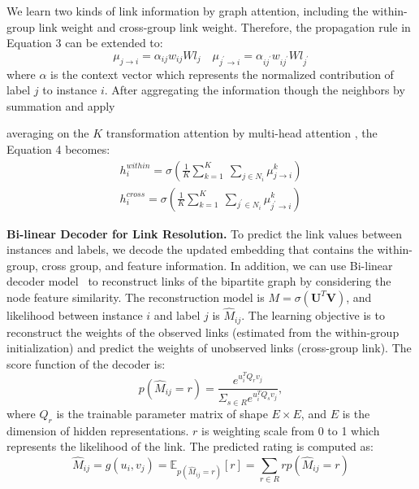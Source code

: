\documentclass[letterpaper]{article} \usepackage{aaai20}  \usepackage{times}  \usepackage{helvet} \usepackage{courier}  \usepackage[hyphens]{url}  \usepackage{graphicx} \urlstyle{rm} \def\UrlFont{\rm}  \frenchspacing  \setlength{\pdfpagewidth}{8.5in}  \setlength{\pdfpageheight}{11in}  \frenchspacing
\begin{document}
\noindent We learn two kinds of link information by graph attention, including the within-group link weight and cross-group link weight. 
Therefore, the propagation rule in Equation 3 can be extended to:
\begin{equation}
\mu_{j \rightarrow i} = \alpha_{ij} w_{ij} W l_j  \quad
\mu_{j^{\prime} \rightarrow i} = \alpha_{ij^{\prime}} w_{ij^\prime} W l_{j^{\prime}} 
\end{equation}
where $\alpha$ is the context vector which represents the normalized contribution of label $j$ to instance $i$. 
After aggregating the information though the neighbors by summation and apply
\iffalse
, the Equation 3 becames: 
\begin{equation}
h^{ within}_i = \sigma (\sum_{j \in N_i} \mu_{j \rightarrow i} )  \quad 
h^{ cross}_i = \sigma (\sum_{j^{\prime} \in N_i} \mu_{j^\prime \rightarrow i} )
\end{equation}
$h^{\prime within}_i$ and $h^{\prime outer}_j$ are the updated feature after multiplying the attention coefficient.

To stabilize the learning process, we employ multi-head attention \cite{zitnik2017predicting} to be beneficial. Specifically, $K$ independent attention mechanisms execute the transformation of Equation 9, and then their features are concatenated. 
Later, we apply 
\fi
averaging on the $K$ transformation attention by multi-head attention \cite{zitnik2017predicting}, the Equation 4 becomes: \begin{align}
h^{ within}_i = \sigma(\frac{1}{K}\sum_{k=1}^K \ \sum_{j \in N_i} \mu^k_{j \rightarrow i}) \\ 
h^{ cross}_i = \sigma(\frac{1}{K}\sum_{k=1}^K \ \sum_{j^\prime \in N_i} \mu^k_{j^\prime \rightarrow i})
\end{align}



\noindent\textbf{Bi-linear Decoder for Link Resolution.}
To predict the link values between instances and labels, we decode the updated embedding that contains the within-group, cross group, and feature information.
In addition, we can use Bi-linear decoder model~\cite{kiros2014unifying} to reconstruct links of the bipartite graph by considering the node feature similarity.
The reconstruction model is $M = \sigma ( \boldsymbol{U}^{T}\boldsymbol{V})$, and likelihood between instance $i$ and label $j$ is $\hat{M}_{ij}$. The learning objective is to reconstruct the weights of the observed links (estimated from the within-group initialization) and predict the weights of unobserved links (cross-group link).  The score function of the decoder is:
\begin{equation}
p(\hat{M}_{ij}=r) = \frac{e^{u^T_i Q_r v_j}}{\Sigma_{s\in R}e^{u^T_i Q_s v_j} },
\end{equation}
where $Q_r$ is the trainable parameter matrix of shape $E \times E$, and $E$ is the dimension of hidden representations. $r$ is weighting scale from 0 to 1 which represents the likelihood of the link.
The predicted rating is computed as:
{\footnotesize{
\begin{equation}
\hat{M}_{ij} = g(u_i,v_j) = \mathbb{E}_{p(\hat{M}_{ij}=r)}[r] = \sum_{r \in R} r p(\hat{M}_{ij}=r)
\end{equation}}
}
\end{document}
